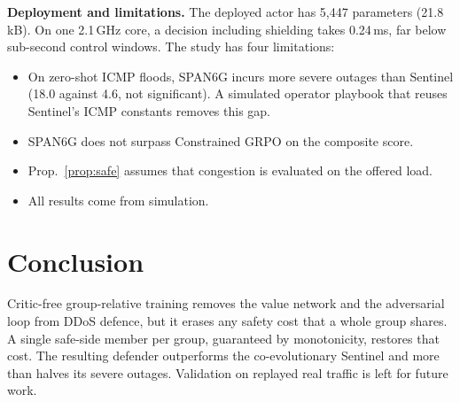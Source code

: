 \documentclass[journal]{IEEEtran}
\begin{document}
\textbf{Deployment and limitations.} The deployed actor has 5{,}447 parameters (21.8\,kB). On one 2.1\,GHz core, a decision including shielding takes 0.24\,ms, far below sub-second control windows. The study has four limitations:
\begin{itemize}
\item On zero-shot ICMP floods, SPAN6G incurs more severe outages than Sentinel (18.0 against 4.6, not significant). A simulated operator playbook that reuses Sentinel's ICMP constants removes this gap.
\item SPAN6G does not surpass Constrained GRPO on the composite score.
\item Prop.~\ref{prop:safe} assumes that congestion is evaluated on the offered load.
\item All results come from simulation.
\end{itemize}

\section{Conclusion}
Critic-free group-relative training removes the value network and the adversarial loop from DDoS defence, but it erases any safety cost that a whole group shares. A single safe-side member per group, guaranteed by monotonicity, restores that cost. The resulting defender outperforms the co-evolutionary Sentinel and more than halves its severe outages. Validation on replayed real traffic is left for future work.



\end{document}
